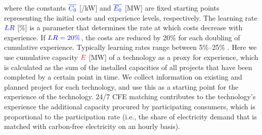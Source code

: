 \documentclass[pdflatex,sn-basic, Numbered]{sn-jnl}%
\theoremstyle{thmstyleone}%
\theoremstyle{thmstyletwo}%
\theoremstyle{thmstylethree}%
\begin{document}
\noindent where the constants $\color{blue}\overline{C_0}$ [\officialeuro/kW] and $\color{blue}\overline{E_0}$ [MW] are fixed starting points representing the initial costs and experience levels, respectively. The learning rate $\color{blue}LR$ [\%] is a parameter that determines the rate at which costs decrease with experience. If $\color{blue}LR=20\%$, the costs are reduced by 20\% for each doubling of cumulative experience. Typically learning rates range between 5\%--25\% \cite{waySuppplementaryMaterialsEmpirically2022}. Here we use cumulative capacity $\color{red}E$ [MW] of a technology as a proxy for experience, which is calculated as the sum of the installed capacities of all projects that have been completed by a certain point in time. We collect information on existing and planned project for each technology, and use this as a starting point for the experience of the technology. 24/7 CFE matching contributes to the technology's experience the additional capacity procured by participating consumers, which is proportional to the participation rate (i.e., the share of electricity demand that is matched with carbon-free electricity on an hourly basis).
\end{document}
